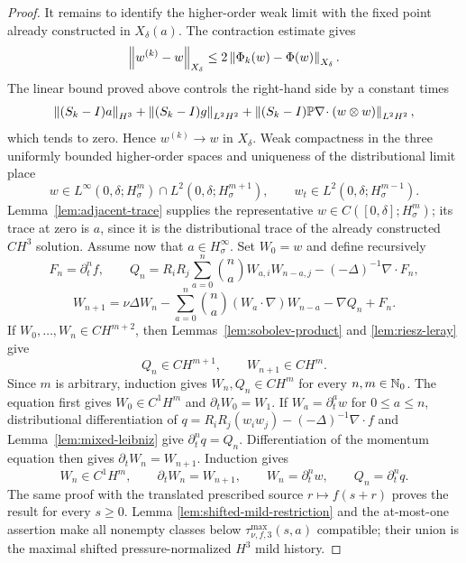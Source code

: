 \begin{proof}
It remains to identify the higher-order weak limit with the fixed point already
constructed in \(X_\delta(a)\).  The contraction estimate gives
\[
 \left\lVert w^{(k)}-w\right\rVert_{X_\delta}
 \le2\left\lVert \Phi_k(w)-\Phi(w)\right\rVert_{X_\delta}.
\]
The linear bound proved above controls the right-hand side by a constant times
\[
 \left\lVert (S_k-I)a\right\rVert_{H^3}
 +\left\lVert (S_k-I)g\right\rVert_{L^2H^2}
 +\left\lVert (S_k-I)\mathbb P\nabla\!\cdot(w\otimes w)\right\rVert_{L^2H^2},
\]
which tends to zero.  Hence \(w^{(k)}\to w\) in \(X_\delta\).  Weak
compactness in the three uniformly bounded higher-order spaces and uniqueness
of the distributional limit place
\[
 w\in L^\infty(0,\delta;H^m_\sigma)\cap L^2(0,\delta;H^{m+1}_\sigma),
 \qquad w_t\in L^2(0,\delta;H^{m-1}_\sigma).
\]
Lemma~\ref{lem:adjacent-trace} supplies the representative
\(w\in C([0,\delta];H^m_\sigma)\); its trace at zero is \(a\), since it is
the distributional trace of the already constructed \(C H^3\) solution.
Assume now that \(a\in H^\infty_\sigma\).  Set \(W_0=w\) and define
recursively
\[
 F_n=\partial_t^nf,\qquad
 Q_n=R_iR_j\sum_{a=0}^n\binom naW_{a,i}W_{n-a,j}
 -(-\Delta)^{-1}\nabla\cdot F_n,
\]
\[
 W_{n+1}=\nu\Delta W_n
 -\sum_{a=0}^n\binom na(W_a\cdot\nabla)W_{n-a}-\nabla Q_n+F_n.
\]
If \(W_0,\ldots,W_n\in C H^{m+2}\), then
Lemmas~\ref{lem:sobolev-product} and \ref{lem:riesz-leray} give
\[
 Q_n\in C H^{m+1},
 \qquad
 W_{n+1}\in C H^m.
\]
Since \(m\) is arbitrary, induction gives \(W_n,Q_n\in C H^m\) for every
\(n,m\in\mathbb N_0\).  The equation first gives
\(W_0\in C^1H^m\) and \(\partial_tW_0=W_1\).  If
\(W_a=\partial_t^aw\) for \(0\le a\le n\), distributional differentiation
of
\(
 q=R_iR_j(w_iw_j)-(-\Delta)^{-1}\nabla\cdot f
\)
and Lemma~\ref{lem:mixed-leibniz} give
\(\partial_t^nq=Q_n\).  Differentiation of the momentum equation then gives
\(\partial_tW_n=W_{n+1}\).  Induction gives
\[
 W_n\in C^1H^m,
 \qquad
 \partial_tW_n=W_{n+1},
 \qquad
 W_n=\partial_t^nw,
 \qquad
 Q_n=\partial_t^nq.
\]
The same proof with the translated prescribed source
\(r\mapsto f(s+r)\) proves the result for every \(s\ge0\).  Lemma
\ref{lem:shifted-mild-restriction} and the at-most-one assertion make all
nonempty classes below \(\tau_{\nu,f,3}^{\max}(s,a)\) compatible; their union
is the maximal shifted pressure-normalized \(H^3\) mild history.
\end{proof}
